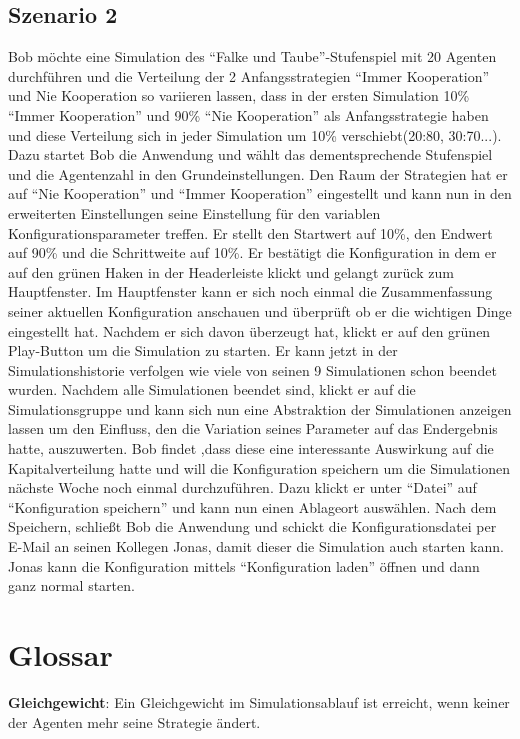 \documentclass[parskip=full,11pt]{scrartcl}
\begin{document}
\subsection{Szenario 2}
Bob möchte eine Simulation des \enquote{Falke und Taube}-Stufenspiel mit 20 Agenten durchführen und die Verteilung der 2 Anfangsstrategien \enquote{Immer Kooperation} und Nie Kooperation so variieren lassen, dass in der ersten Simulation 10\% \enquote{Immer Kooperation} und 90\% \enquote{Nie Kooperation} als Anfangsstrategie haben und diese Verteilung sich in jeder Simulation um 10\% verschiebt(20:80, 30:70...). Dazu startet Bob die Anwendung und wählt das dementsprechende Stufenspiel und die Agentenzahl in den Grundeinstellungen. Den Raum der Strategien hat er auf \enquote{Nie Kooperation} und \enquote{Immer Kooperation} eingestellt und kann nun in den erweiterten Einstellungen seine Einstellung für den variablen Konfigurationsparameter treffen. Er stellt den Startwert auf 10\%, den Endwert auf 90\% und die Schrittweite auf 10\%. Er bestätigt die Konfiguration in dem er auf den grünen Haken in der Headerleiste klickt und gelangt zurück zum Hauptfenster. Im Hauptfenster kann er sich noch einmal die Zusammenfassung seiner aktuellen Konfiguration anschauen und überprüft ob er die wichtigen Dinge eingestellt hat. Nachdem er sich davon überzeugt hat, klickt er auf den grünen Play-Button um die Simulation zu starten. Er kann jetzt in der Simulationshistorie verfolgen wie viele von seinen 9 Simulationen schon beendet wurden. Nachdem alle Simulationen beendet sind, klickt er auf die Simulationsgruppe und kann sich nun eine Abstraktion der Simulationen anzeigen lassen um den Einfluss, den die Variation seines Parameter auf das Endergebnis hatte, auszuwerten. Bob findet ,dass diese eine interessante Auswirkung auf die Kapitalverteilung hatte und will die Konfiguration speichern um die Simulationen nächste Woche noch einmal durchzuführen. Dazu klickt er unter \enquote{Datei} auf \enquote{Konfiguration speichern} und kann nun einen Ablageort auswählen. Nach dem Speichern, schließt Bob die Anwendung und schickt die Konfigurationsdatei per E-Mail an seinen Kollegen Jonas, damit dieser die Simulation auch starten kann. Jonas kann die Konfiguration mittels \enquote{Konfiguration laden} öffnen und dann ganz normal starten.

\newpage
\section{Glossar}

\textbf{Gleichgewicht}:
Ein Gleichgewicht im Simulationsablauf ist erreicht, wenn keiner der Agenten mehr seine Strategie ändert.
\end{document}

